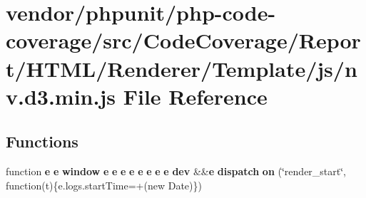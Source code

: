 \section{vendor/phpunit/php-\/code-\/coverage/src/\+Code\+Coverage/\+Report/\+H\+T\+M\+L/\+Renderer/\+Template/js/nv.d3.\+min.\+js File Reference}
\label{nv_8d3_8min_8js}
\subsection*{Functions}
\begin{DoxyCompactItemize}
\item 
function {\bf e} {\bf e} {\bf window} {\bf e} {\bf e} {\bf e} {\bf e} {\bf e} {\bf e} {\bf e} {\bf e} {\bf dev} \&\&{\bf e} {\bf dispatch} {\bf on} (\char`\"{}render\+\_\+start\char`\"{}, function(t)\{e.\+logs.\+start\+Time=+(new Date)\})
\end{DoxyCompactItemize}
